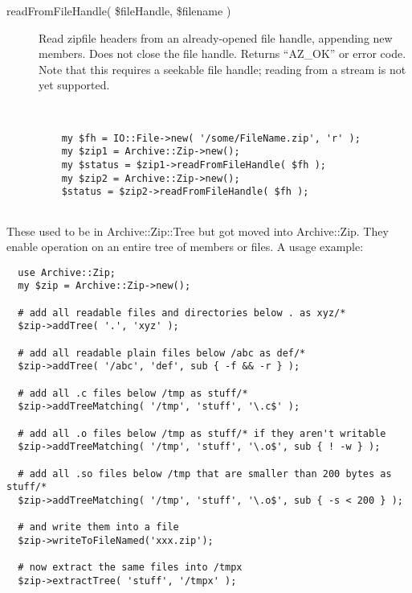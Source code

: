 \documentclass[]{article}
\begin{document}
\begin{description}
\item[readFromFileHandle( \$fileHandle, \$filename )]
Read zipfile headers from an already-opened file handle, appending new
members. Does not close the file handle. Returns ``AZ\_OK'' or error
code. Note that this requires a seekable file handle; reading from a
stream is not yet supported.

~

\begin{verbatim}
    my $fh = IO::File->new( '/some/FileName.zip', 'r' );
    my $zip1 = Archive::Zip->new();
    my $status = $zip1->readFromFileHandle( $fh );
    my $zip2 = Archive::Zip->new();
    $status = $zip2->readFromFileHandle( $fh );
    
\end{verbatim}
\end{description}


These used to be in Archive::Zip::Tree but got moved into Archive::Zip.
They enable operation on an entire tree of members or files. A usage
example:

\begin{verbatim}
  use Archive::Zip;
  my $zip = Archive::Zip->new();
  
  # add all readable files and directories below . as xyz/*
  $zip->addTree( '.', 'xyz' );
  
  # add all readable plain files below /abc as def/*
  $zip->addTree( '/abc', 'def', sub { -f && -r } );
  
  # add all .c files below /tmp as stuff/*
  $zip->addTreeMatching( '/tmp', 'stuff', '\.c$' );
  
  # add all .o files below /tmp as stuff/* if they aren't writable
  $zip->addTreeMatching( '/tmp', 'stuff', '\.o$', sub { ! -w } );
  
  # add all .so files below /tmp that are smaller than 200 bytes as stuff/*
  $zip->addTreeMatching( '/tmp', 'stuff', '\.o$', sub { -s < 200 } );
  
  # and write them into a file
  $zip->writeToFileNamed('xxx.zip');
  
  # now extract the same files into /tmpx
  $zip->extractTree( 'stuff', '/tmpx' );
\end{verbatim}
\end{document}

